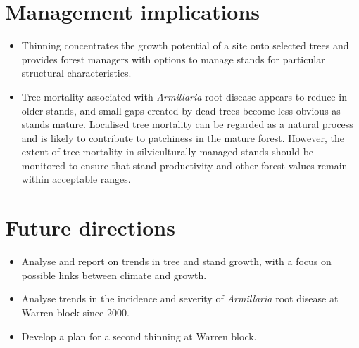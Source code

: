 \documentclass[version=last, paper=a4, DIV=18, usenames, dvipsnames]{scrartcl}
\begin{document}
\section*{Management implications}
\begin{itemize}
\itemsep1pt\parskip0pt
\item
  Thinning concentrates the growth potential of a site onto selected
  trees and provides forest managers with options to manage stands for
  particular structural characteristics.
\item
  Tree mortality associated with \emph{Armillaria} root disease appears
  to reduce in older stands, and small gaps created by dead trees become
  less obvious as stands mature. Localised tree mortality can be
  regarded as a natural process and is likely to contribute to
  patchiness in the mature forest. However, the extent of tree mortality
  in silviculturally managed stands should be monitored to ensure that
  stand productivity and other forest values remain within acceptable
  ranges.
\end{itemize}



\section*{Future directions}
\begin{itemize}
\itemsep1pt\parskip0pt
\item
  Analyse and report on trends in tree and stand growth, with a focus on
  possible links between climate and growth.
\item
  Analyse trends in the incidence and severity of \emph{Armillaria} root
  disease at Warren block since 2000.
\item
  Develop a plan for a second thinning at Warren block.
\end{itemize}




\clearpage
\end{document}
